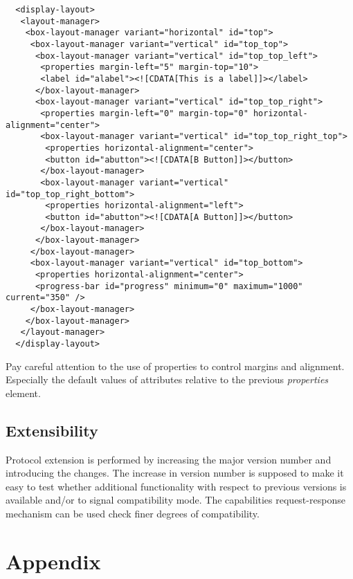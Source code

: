 \documentclass{article}
\begin{document}
   \small \begin{verbatim}
  <display-layout>
   <layout-manager>
    <box-layout-manager variant="horizontal" id="top">
     <box-layout-manager variant="vertical" id="top_top">
      <box-layout-manager variant="vertical" id="top_top_left">
       <properties margin-left="5" margin-top="10">
       <label id="alabel"><![CDATA[This is a label]]></label>
      </box-layout-manager>
      <box-layout-manager variant="vertical" id="top_top_right">
       <properties margin-left="0" margin-top="0" horizontal-alignment="center">
       <box-layout-manager variant="vertical" id="top_top_right_top">
        <properties horizontal-alignment="center">
        <button id="abutton"><![CDATA[B Button]]></button>
       </box-layout-manager>
       <box-layout-manager variant="vertical" id="top_top_right_bottom">
        <properties horizontal-alignment="left">
        <button id="abutton"><![CDATA[A Button]]></button>
       </box-layout-manager>
      </box-layout-manager>
     </box-layout-manager>
     <box-layout-manager variant="vertical" id="top_bottom">
      <properties horizontal-alignment="center">
      <progress-bar id="progress" minimum="0" maximum="1000" current="350" />
     </box-layout-manager>
    </box-layout-manager>
   </layout-manager>
  </display-layout>\end{verbatim}
  \normalsize

  \noindent Pay careful attention to the use of properties to control margins and
  alignment. Especially the default values of attributes relative to the
  previous \textit{properties} element.

  \subsection{Extensibility}

   Protocol extension is performed by increasing the major version number and
   introducing the changes. The increase in version number is supposed to make
   it easy to test whether additional functionality with respect to previous
   versions is available and/or to signal compatibility mode. The capabilities
   request-response mechanism can be used check finer degrees of compatibility.
   
  \enlargethispage*{4pt}
  

  \section{Appendix}
  \pagestyle{empty}
\end{document}
